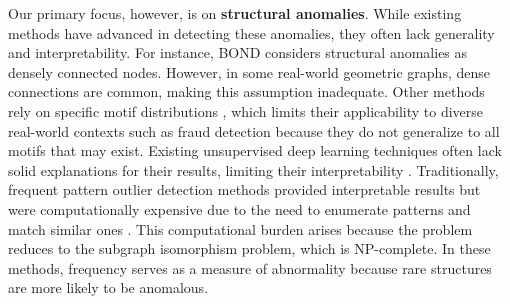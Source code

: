 \documentclass[preprint,12pt]{elsarticle}
\theoremstyle{plain}
\theoremstyle{definition}
\theoremstyle{remark}
\begin{document}
Our primary focus, however, is on \textbf{structural anomalies}. While existing methods have advanced in detecting these anomalies, they often lack generality and interpretability. For instance, BOND \cite{NEURIPS2022-acc1ec4a} considers structural anomalies as densely connected nodes. However, in some real-world geometric graphs, dense connections are common, making this assumption inadequate. Other methods rely on specific motif distributions \cite{bandyopadhyay2020outlier,xu2022contrastive,yuan2024higherorder}, which limits their applicability to diverse real-world contexts such as fraud detection because they do not generalize to all motifs that may exist. Existing unsupervised deep learning techniques often lack solid explanations for their results, limiting their interpretability \cite{angelov2021explainable}. Traditionally, frequent pattern outlier detection methods provided interpretable results but were computationally expensive due to the need to enumerate patterns and match similar ones \cite{bressan2021faster,he2004frequent,yan2002gspan}. This computational burden arises because the problem reduces to the subgraph isomorphism problem, which is NP-complete. In these methods, frequency serves as a measure of abnormality because rare structures are more likely to be anomalous.
\end{document}
